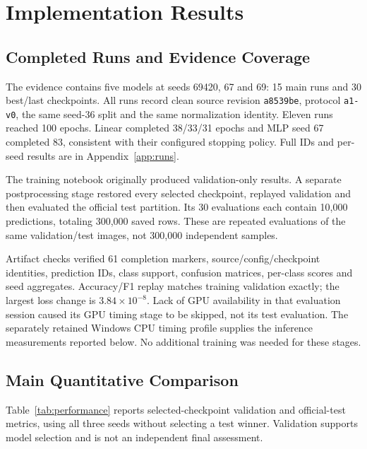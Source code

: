 \section{Implementation Results}
\label{sec:results}
\subsection{Completed Runs and Evidence Coverage}
The evidence contains five models at seeds 69420, 67 and 69: 15 main runs and
30 best/last checkpoints. All runs record clean source revision \texttt{a8539be},
protocol \texttt{a1-v0}, the same seed-36 split and the same normalization identity.
Eleven runs reached 100 epochs. Linear completed 38/33/31 epochs and MLP seed 67
completed 83, consistent with their configured stopping policy. Full IDs and
per-seed results are in Appendix~\ref{app:runs}.

The training notebook originally produced validation-only results. A separate
postprocessing stage restored every selected checkpoint, replayed validation and
then evaluated the official test partition. Its 30 evaluations each contain
10,000 predictions, totaling 300,000 saved rows. These are repeated evaluations
of the same validation/test images, not 300,000 independent samples.

Artifact checks verified 61 completion markers, source/config/checkpoint identities,
prediction IDs, class support, confusion matrices, per-class scores and seed
aggregates. Accuracy/F1 replay matches training validation exactly; the largest
loss change is \(3.84\times10^{-8}\). Lack of GPU availability in that evaluation
session caused its GPU timing stage to be skipped, not its test evaluation.
The separately retained Windows CPU timing profile supplies the inference
measurements reported below. No additional training was needed for these stages.

\subsection{Main Quantitative Comparison}
Table~\ref{tab:performance} reports selected-checkpoint validation and official-test
metrics, using all three seeds without selecting a test winner.
Validation supports model selection and is not an independent final assessment.
\begin{table}[H]\centering\small
\caption{Mean \(\pm\) sample SD over three seeds. Accuracy/F1 are percentages;
CE is sample-weighted cross-entropy.}
\label{tab:performance}

\end{table}

